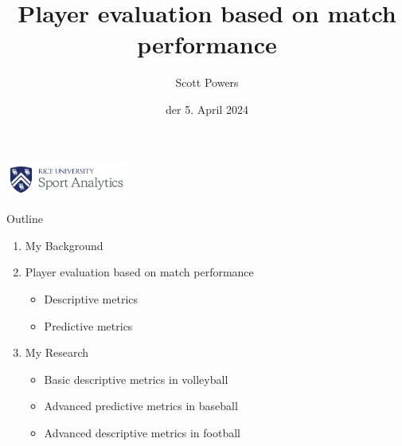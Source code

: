 \documentclass[handout]{beamer}
\title{Player evaluation based on match performance}
\author{\color{ricerichblue} Scott Powers}
\date{der 5. April 2024}
\begin{document}
\begin{frame}[noframenumbering]
  \maketitle
  \vfill
  \hfill\includegraphics[width = 4cm]{images/rice_logo.png}
\end{frame}


\begin{frame}{Outline}
  \begin{enumerate}
    \item My Background
    \item Player evaluation based on match performance
    \begin{itemize} 
      \item Descriptive metrics
      \item Predictive metrics
    \end{itemize}
    \item My Research
    \begin{itemize}
      \item Basic descriptive metrics in volleyball
      \item Advanced predictive metrics in baseball
      \item Advanced descriptive metrics in football
    \end{itemize}
  \end{enumerate}
\end{frame}
\end{document}
